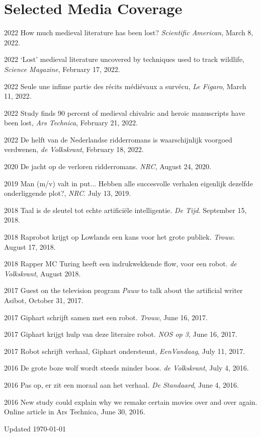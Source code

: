 \documentclass[12pt,letterpaper]{report}
\begin{document}
\section*{Selected Media Coverage}
\begin{tablist}
\item[2022] \tab{}How much medieval literature has been lost? \textit{Scientific
    American}, March 8, 2022.
\item[2022] \tab{}`Lost' medieval literature uncovered by techniques used to track
  wildlife, \textit{Science Magazine}, February 17, 2022.
\item[2022] \tab{}Seule une infime partie des récits médiévaux a survécu, \textit{Le
    Figaro}, March 11, 2022.
\item[2022] \tab{}Study finds 90 percent of medieval chivalric and heroic manuscripts have
  been lost, \textit{Ars Technica}, February 21, 2022.
\item[2022] \tab{}De helft van de Nederlandse ridderromans is waarschijnlijk voorgoed
  verdwenen, \textit{de Volkskrant}, February 18, 2022.
\item[2020] \tab{}De jacht op de verloren ridderromans. \textit{NRC}, August 24, 2020.
\item[2019] \tab{}Man (m/v) valt in put... Hebben alle succesvolle verhalen eigenlijk
  dezelfde onderliggende plot?, \textit{NRC}. July 13, 2019. 
\item[2018] \tab{}Taal is de sleutel tot echte artificiële intelligentie. \textit{De Tijd}.
  September 15, 2018.
\item[2018] \tab{}Raprobot krijgt op Lowlands een kans voor het grote publiek. \textit{Trouw}.
  August 17, 2018. 
\item[2018] \tab{}Rapper MC Turing heeft een indrukwekkende flow, voor een robot. \textit{de
    Volkskrant}, August 2018. 
\item[2017] \tab{}Guest on the television program \textit{Pauw} to talk about the artificial
  writer Asibot, October 31, 2017.
\item[2017] \tab{}Giphart schrijft samen met een robot. \textit{Trouw}, June 16, 2017. 
\item[2017] \tab{}Giphart krijgt hulp van deze literaire robot. \textit{NOS op 3}, June 16, 2017. 
\item[2017] \tab{}Robot schrijft verhaal, Giphart ondersteunt, \textit{EenVandaag}, July
  11, 2017.
\item[2016] \tab{}De grote boze wolf wordt steeds minder boos. \textit{de Volkskrant},
  July 4, 2016. 
\item[2016] \tab{}Pas op, er zit een moraal aan het verhaal. \textit{De Standaard}, June
  4, 2016. 
\item[2016] \tab{}New study could explain why we remake certain movies over and over
  again. Online article in Ars Technica, June 30, 2016.
\end{tablist}
  

\begin{center}
  \vfill
Updated \monthyeardate\today
\end{center}
\end{document}
